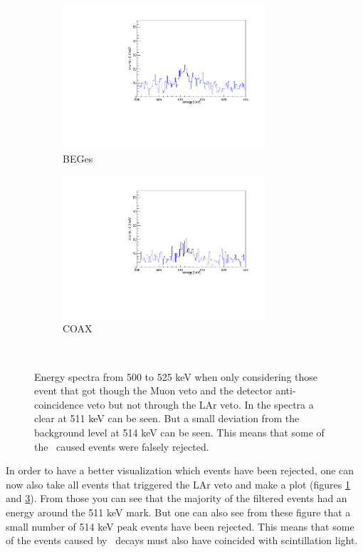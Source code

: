 \documentclass[encoding=utf8,british]{tumphthesis}
\begin{document}
\begin{figure}[t!]
	\centering
	\begin{subfigure}{.5\textwidth}
		\includegraphics[width=75mm]{./Bilder/AntiLArBEGe.pdf}
		\caption{BEGes}
		\label{fig:AntiLArBEGes}
	\end{subfigure}\hfill%
	\begin{subfigure}{.5\textwidth}
		\includegraphics[width=75mm]{./Bilder/AntiLArCOAX.pdf}
		\caption{COAX}
		\label{fig:AntiLArCOAX}
	\end{subfigure}
	\\
	\vspace{0.5cm}
	\caption{Energy spectra from 500 to 525 keV when only considering those event that got though the Muon veto and the detector anti-coincidence veto but not through the LAr veto. In the spectra a clear at 511 keV can be seen. But a small deviation from the background level at 514 keV can be seen. This means that some of the \Kr\ caused events were falsely rejected.}
\end{figure}

In order to have a better visualization which events have been rejected, one can now also take all events that triggered the LAr veto and make a plot (figures \ref{fig:AntiLArBEGes} and \ref{fig:AntiLArCOAX}).
From those you can see that the majority of the filtered events had an energy around the 511 keV mark.
But one can also see from these figure that a small number of 514 keV peak events have been rejected.
This means that some of the events caused by \Kr\ decays must also have coincided with scintillation light.
\\
\end{document}
